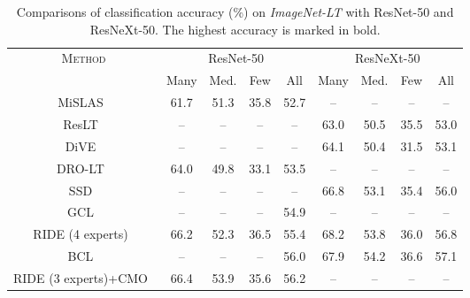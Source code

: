 \documentclass[10pt,journal,compsoc]{IEEEtran}
\begin{document}
\begin{table*}[t]
\centering
\small
\renewcommand\arraystretch{1.1}
\caption{\small Comparisons of classification accuracy (\%) on \emph{ImageNet-LT} with ResNet-50 and ResNeXt-50. The highest accuracy is marked in bold.}
\begin{tabular}{c|cccc|cccc}
\toprule
\multirow{2}{*}{\textsc{Method}}           & \multicolumn{4}{c|}{ResNet-50}                                 & \multicolumn{4}{c}{ResNeXt-50}                                \\
                                           & \textsf{Many} & \textsf{Med.} & \textsf{Few}  & \textsf{All}  & \textsf{Many} & \textsf{Med.} & \textsf{Few}  & \textsf{All}  \\
\hline
MiSLAS~\cite{calibrationcvpr2021}          & 61.7          & 51.3          & 35.8          & 52.7          & --            & --            & --            & --    \bigstrut[t] \\
ResLT~\cite{ResLTPAMI}                     & --            & --            & --            & --            & 63.0          & 50.5          & 35.5          & 53.0          \\
DiVE~\cite{He_2021_ICCV}                   & --            & --            & --            & --            & 64.1          & 50.4          & 31.5          & 53.1          \\
DRO-LT~\cite{Samuel_2021_ICCV}             & 64.0          & 49.8          & 33.1          & 53.5          & --            & --            & --            & --            \\
SSD~\cite{li2021self}                      & --            & --            & --            & --            & 66.8          & 53.1          & 35.4          & 56.0          \\
GCL~\cite{GCLcvpr22}                       & --            & --            & --            & 54.9          & --            & --            & --            & --            \\
RIDE (4 experts)~\cite{wang2021longtailed} & 66.2          & 52.3          & 36.5          & 55.4          & 68.2          & 53.8          & 36.0          & 56.8          \\
BCL~\cite{BCLcvpr22}                       & --            & --            & --            & 56.0          & 67.9          & 54.2          & 36.6          & 57.1          \\
RIDE (3 experts)+CMO~\cite{CMOcvpr22}      & 66.4          & 53.9          & 35.6          & 56.2          & --            & --            & --            & --            \\

\end{tabular}
\end{table*}
\end{document}
